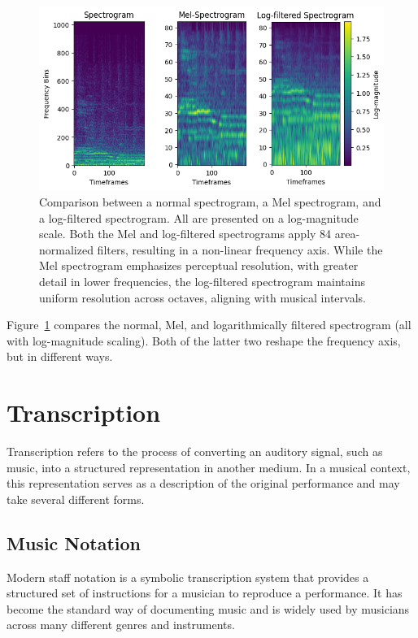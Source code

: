 \begin{figure}[H]
    \centering
    \hspace*{-0.6cm}
    \includegraphics[scale=0.9]{figures/allspectrograms}
    \caption{Comparison between a normal spectrogram, a Mel spectrogram, and a log-filtered spectrogram. All are presented on a log-magnitude scale. Both the Mel and log-filtered spectrograms apply 84 area-normalized filters, resulting in a non-linear frequency axis. While the Mel spectrogram emphasizes perceptual resolution, with greater detail in lower frequencies, the log-filtered spectrogram maintains uniform resolution across octaves, aligning with musical intervals.}
    \label{AllSpectrogramFigure}
\end{figure}

Figure~\ref{AllSpectrogramFigure} compares the normal, Mel, and logarithmically filtered spectrogram (all with log-magnitude scaling). Both of the latter two reshape the frequency axis, but in different ways.

\section{Transcription}

Transcription refers to the process of converting an auditory signal, such as music, into a structured representation in another medium. In a musical context, this representation serves as a description of the original performance and may take several different forms.

\subsection{Music Notation}

Modern staff notation is a symbolic transcription system that provides a structured set of instructions for a musician to reproduce a performance. It has become the standard way of documenting music and is widely used by musicians across many different genres and instruments.

